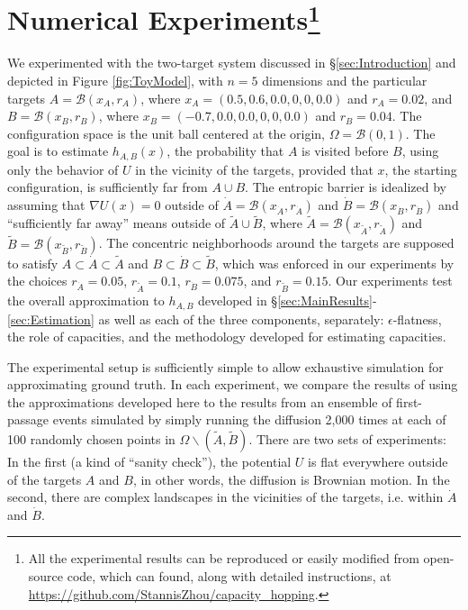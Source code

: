 \documentclass[nofootinbib,english, aip, jcp, priprint, graphicx,floatfix]{revtex4-1}
\theoremstyle{plain}
\theoremstyle{definition}
\theoremstyle{plain}
\newcommand{\bb}[1]{\mathcal{B}\left(#1\right)}
\newcommand{\dA}{{\dot A}}
\newcommand{\tA}{{\tilde A}}
\newcommand{\dB}{{\dot B}}
\newcommand{\tB}{{\tilde B}}
\begin{document}
 \section{Numerical Experiments\footnote{All the experimental results can be reproduced or easily modified from open-source code, which can found, along with detailed instructions, at
\url{https://github.com/StannisZhou/capacity_hopping}.}}
\label{sec:Experiments}
We experimented with the two-target system discussed in \S\ref{sec:Introduction} and depicted in Figure \ref{fig:ToyModel}, with $n=5$ dimensions 
and the particular targets $A=\bb{x_A, r_A}$,  where $x_A=(0.5,0.6,0.0,0,0,0.0)$ and $r_A=0.02$, and 
$B=\bb{x_B, r_B}$,  where $x_B=(-0.7,0.0,0.0,0,0,0.0)$ and $r_B=0.04$. The configuration space is the unit ball centered at 
the origin, $\Omega=\bb{0,1}$. 
The goal is to estimate $h_{A,B}(x)$, the probability that $A$ is visited before $B$, using only the behavior of $U$ in the vicinity of the targets, provided that $x$, the starting configuration, is sufficiently far from $A\cup B$. The entropic barrier is idealized by assuming that $\nabla U(x)=0$ outside of $\dA=\bb{x_\dA, r_\dA}$ and $\dB=\bb{x_\dB, r_\dB}$ and ``sufficiently far away'' means outside of $\tA \cup \tB$, where $\tA=\bb{x_\tA, r_\tA}$ and $\tB=\bb{x_\tB, r_\tB}$. The concentric neighborhoods around the targets are supposed to satisfy $A\subset\dA\subset\tA$ and 
$B\subset\dB\subset\tB$, which was enforced in our experiments by the choices $r_\dA= 0.05$, $r_\tA=0.1$, $r_\dB=0.075$, and
$r_\tB=0.15$.
Our experiments test the overall approximation to $h_{A,B}$ developed in \S\ref{sec:MainResults}-\ref{sec:Estimation} as well as each of the three components, separately: $\epsilon$-flatness, the role of capacities, and the methodology developed for estimating capacities.

The experimental setup is sufficiently simple to allow
exhaustive simulation for approximating ground truth. In each experiment, we compare the results of using the approximations developed here to the results from an ensemble of first-passage events simulated by simply running the diffusion 2,000 times at each of 100 randomly chosen points in $\Omega\backslash (\tA,\tB)$. There are two sets of experiments: In the first (a kind of ``sanity check''), the potential $U$ is flat everywhere outside of the targets $A$ and $B$, in other words, the diffusion is Brownian motion. In the second, there are complex landscapes in the vicinities of the targets, i.e. within $\dA$ and $\dB$.
\end{document}
